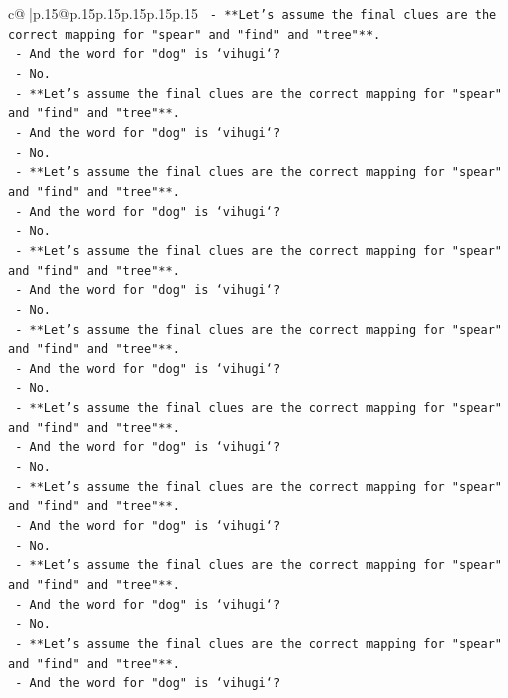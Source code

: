 \documentclass{article}
\begin{document}
{\begin{supertabular}{c@{$\;$}|p{.15\linewidth}@{}p{.15\linewidth}p{.15\linewidth}p{.15\linewidth}p{.15\linewidth}p{.15\linewidth}}
{{{\texttt{  {-} **Let's assume the final clues are the correct mapping for "spear" and "find" and "tree"**.} \\
\texttt{  {-} And the word for "dog" is `vihugi`?} \\
\texttt{  {-} No.} \\
\texttt{  {-} **Let's assume the final clues are the correct mapping for "spear" and "find" and "tree"**.} \\
\texttt{  {-} And the word for "dog" is `vihugi`?} \\
\texttt{  {-} No.} \\
\texttt{  {-} **Let's assume the final clues are the correct mapping for "spear" and "find" and "tree"**.} \\
\texttt{  {-} And the word for "dog" is `vihugi`?} \\
\texttt{  {-} No.} \\
\texttt{  {-} **Let's assume the final clues are the correct mapping for "spear" and "find" and "tree"**.} \\
\texttt{  {-} And the word for "dog" is `vihugi`?} \\
\texttt{  {-} No.} \\
\texttt{  {-} **Let's assume the final clues are the correct mapping for "spear" and "find" and "tree"**.} \\
\texttt{  {-} And the word for "dog" is `vihugi`?} \\
\texttt{  {-} No.} \\
\texttt{  {-} **Let's assume the final clues are the correct mapping for "spear" and "find" and "tree"**.} \\
\texttt{  {-} And the word for "dog" is `vihugi`?} \\
\texttt{  {-} No.} \\
\texttt{  {-} **Let's assume the final clues are the correct mapping for "spear" and "find" and "tree"**.} \\
\texttt{  {-} And the word for "dog" is `vihugi`?} \\
\texttt{  {-} No.} \\
\texttt{  {-} **Let's assume the final clues are the correct mapping for "spear" and "find" and "tree"**.} \\
\texttt{  {-} And the word for "dog" is `vihugi`?} \\
\texttt{  {-} No.} \\
\texttt{  {-} **Let's assume the final clues are the correct mapping for "spear" and "find" and "tree"**.} \\
\texttt{  {-} And the word for "dog" is `vihugi`?} \\
}}}
\end{supertabular}}
\end{document}
